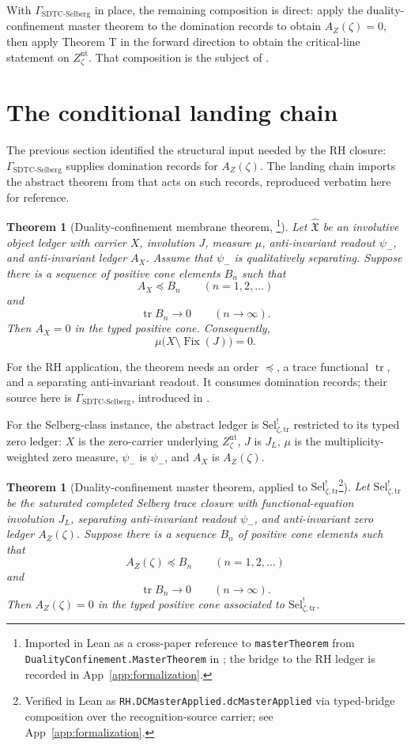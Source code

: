 \documentclass[11pt]{article}
\DeclareMathOperator{\Fix}{Fix}
\DeclareMathOperator{\trace}{tr}
\newcommand{\JL}{J_{L}}
\newcommand{\psimRH}{\psi_{-}}
\newcommand{\Znt}{Z_{\zeta}^{\mathrm{nt}}}
\newcommand{\AZ}{A_{Z}(\zeta)}
\newcommand{\Sel}{\mathrm{Sel}^{!}_{\zeta,\mathrm{tr}}}
\newcommand{\GamSDTCSelberg}{\Gamma_{\mathrm{SDTC\text{-}Selberg}}}
\newcommand{\psim}{\psi_{-}}
\newcommand{\AX}{A_{X}}
\newcommand{\IOL}{\hat{\mathfrak{X}}}
\newtheorem{theorem}{Theorem}[section]
\newtheorem*{theorem*}{Theorem}
\theoremstyle{definition}
\begin{document}
With \(\GamSDTCSelberg\) in place, the remaining composition is
direct: apply the duality-confinement master theorem to the
domination records to obtain \(\AZ=0\), then apply Theorem T in the
forward direction to obtain the critical-line statement on \(\Znt\).
That composition is the subject of .
 

\section{The conditional landing chain}
\label{sec:landing_chain}

The previous section identified the structural input needed by the RH
closure: \(\GamSDTCSelberg\) supplies domination records for
\(\AZ\).  The landing chain imports the abstract theorem from
\cite{TsiokosSDTC2026} that acts on such records, reproduced verbatim
here for reference.

\begin{theorem*}[Duality-confinement membrane theorem, \cite{TsiokosSDTC2026}\footnote{Imported in Lean as a cross-paper reference to \texttt{masterTheorem} from \nolinkurl{DualityConfinement.MasterTheorem} in \cite{TsiokosSDTC2026}; the bridge to the RH ledger is recorded in App~\ref{app:formalization}.}]
Let \(\IOL\) be an involutive object ledger with carrier \(X\),
involution \(J\), measure \(\mu\), anti-invariant readout
\(\psim\), and anti-invariant ledger \(\AX\).  Assume that
\(\psim\) is qualitatively separating.  Suppose there is a sequence
of positive cone elements \(B_n\) such that
\[
  \AX\preceq B_n
  \qquad (n=1,2,\ldots)
\]
and
\[
  \trace B_n\to0
  \qquad (n\to\infty).
\]
Then \(\AX=0\) in the typed positive cone.  Consequently,
\[
  \mu\bigl(X\setminus\Fix(J)\bigr)=0.
\]
\end{theorem*}

For the RH application, the theorem needs an order \(\preceq\), a
trace functional \(\trace\), and a separating anti-invariant readout.
It consumes domination records; their source here is
\(\GamSDTCSelberg\), introduced in .

For the Selberg-class instance, the abstract ledger is \(\Sel\)
restricted to its typed zero ledger: \(X\) is the zero-carrier
underlying \(\Znt\), \(J\) is \(\JL\), \(\mu\) is the
multiplicity-weighted zero measure, \(\psim\) is \(\psimRH\), and
\(\AX\) is \(\AZ\).

\begin{theorem}[Duality-confinement master theorem, applied to \(\Sel\)\footnote{Verified in Lean as \nolinkurl{RH.DCMasterApplied.dcMasterApplied} via typed-bridge composition over the recognition-source carrier; see App~\ref{app:formalization}.}]
\label{thm:rh:dc-master-applied}
Let \(\Sel\) be the saturated completed Selberg trace closure with
functional-equation involution \(\JL\), separating anti-invariant
readout \(\psimRH\), and anti-invariant zero ledger \(\AZ\).  Suppose
there is a sequence \(B_n\) of positive cone elements such that
\[
  \AZ\preceq B_n
  \qquad (n=1,2,\ldots)
\]
and
\[
  \trace B_n\to0
  \qquad (n\to\infty).
\]
Then \(\AZ=0\) in the typed positive cone associated to \(\Sel\).
\end{theorem}
\end{document}
